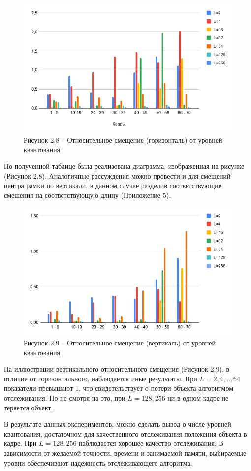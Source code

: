 \begin{figure}[h!]
    \centering
    \includegraphics[width = 14 cm]{tests/img/diag_rlt_disp_x.png}
    \caption*{Рисунок 2.8 -- Относительное смещение (горизонталь) от уровней квантования}
\end{figure}

По полученной таблице была реализована диаграмма, изображенная на рисунке (Рисунок 2.8). Аналогичные рассуждения можно провести и для смещений центра рамки по вертикали, в данном случае разделив соответствующие смешения на соответствующую длину (Приложение 5). 

\begin{figure}[h!]
    \centering
    \includegraphics[width = 14 cm]{tests/img/diag_rlt_disp_y.png}
    \caption*{Рисунок 2.9 -- Относительное смещение (вертикаль) от уровней квантования}
\end{figure}

На иллюстрации вертикального относительного смещения (Рисунок 2.9), в отличие от горизонтального, наблюдается иные результаты. При $L = 2,4,..,64$ показатели превышают 1, что свидетельствует о потери объекта алгоритмом отслеживания. Но не смотря на это, при $L = 128,256$ ни в одном кадре не теряется объект.

В результате данных экспериментов, можно сделать вывод о числе уровней квантования, достаточном для
качественного отслеживания положения объекта в кадре. При $L = 128, 256$ наблюдается хорошее качество отслеживания. В зависимости от желаемой точности, времени и занимаемой памяти, выбираемые уровни обеспечивают надежность отслеживающего алгоритма.
